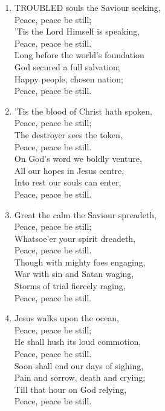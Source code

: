 \documentclass[11pt,a4paper]{article}
\begin{document}
\begin{enumerate}
    \item TROUBLED souls the Saviour seeking, \\
        Peace, peace be still; \\
        'Tis the Lord Himself is speaking, \\
        Peace, peace be still. \\
        Long before the world's foundation \\
        God secured a full salvation; \\
        Happy people, chosen nation; \\
        Peace, peace be still.

    \item 'Tis the blood of Christ hath spoken, \\
        Peace, peace be still; \\
        The destroyer sees the token, \\
        Peace, peace be still. \\
        On God's word we boldly venture, \\
        All our hopes in Jesus centre, \\
        Into rest our souls can enter, \\
        Peace, peace be still.

    \item Great the calm the Saviour spreadeth, \\
        Peace, peace be still; \\
        Whatsoe'er your spirit dreadeth, \\
        Peace, peace be still. \\
        Though with mighty foes engaging, \\
        War with sin and Satan waging, \\
        Storms of trial fiercely raging, \\
        Peace, peace be still.

    \item Jesus walks upon the ocean, \\
        Peace, peace be still; \\
        He shall hush its loud commotion, \\
        Peace, peace be still. \\
        Soon shall end our days of sighing, \\
        Pain and sorrow, death and crying; \\
        Till that hour on God relying, \\
        Peace, peace be still.

\end{enumerate}
\end{document}
